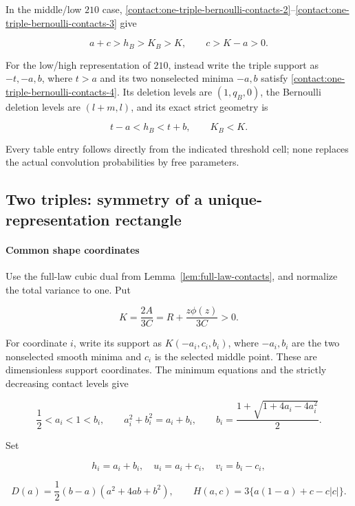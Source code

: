 In the middle/low $210$ case, \eqref{contact:one-triple-bernoulli-contacts-2}--\eqref{contact:one-triple-bernoulli-contacts-3} give

\[
 a+c>h_B>K_B>K,\qquad c>K-a>0.
\tag{B.5.5}\label{contact:one-triple-bernoulli-contacts-5}
\]

For the low/high representation of $210$, instead write the triple support as
$-t,-a,b$, where $t>a$ and its two nonselected minima $-a,b$ satisfy
\eqref{contact:one-triple-bernoulli-contacts-4}. Its deletion levels are $(1,q_B,0)$, the Bernoulli deletion levels
are $(l+m,l)$, and its exact strict geometry is

\[
 t-a<h_B<t+b,\qquad K_B<K.
\tag{B.5.6}\label{contact:one-triple-bernoulli-contacts-6}
\]

Every table entry follows directly from the indicated threshold cell;
none replaces the actual convolution probabilities by free parameters.

\subsection{Two triples: symmetry of a unique-representation rectangle}\label{contact:two-triple-rectangle-exclusion}


\paragraph{Common shape coordinates}

Use the full-law cubic dual from
Lemma~\ref{lem:full-law-contacts}, and normalize the total variance to one. Put

\[
 K=\frac{2A}{3C}=R+\frac{z\phi(z)}{3C}>0.
\]

For coordinate $i$, write its support as $K(-a_i,c_i,b_i)$, where
$-a_i,b_i$ are the two nonselected smooth minima and $c_i$ is the selected
middle point. These are dimensionless support coordinates. The minimum
equations and the strictly decreasing contact levels give

\[
 \frac12<a_i<1<b_i,
 \qquad a_i^2+b_i^2=a_i+b_i,
 \qquad b_i=\frac{1+\sqrt{1+4a_i-4a_i^2}}2.
\tag{B.6.1}\label{contact:two-triple-rectangle-exclusion-1}
\]

Set

\[
 h_i=a_i+b_i,\quad u_i=a_i+c_i,\quad v_i=b_i-c_i,
\]

\[
 D(a)=\frac12(b-a)(a^2+4ab+b^2),\qquad
 H(a,c)=3\{a(1-a)+c-c|c|\}.
\tag{B.6.2}\label{contact:two-triple-rectangle-exclusion-2}
\]

